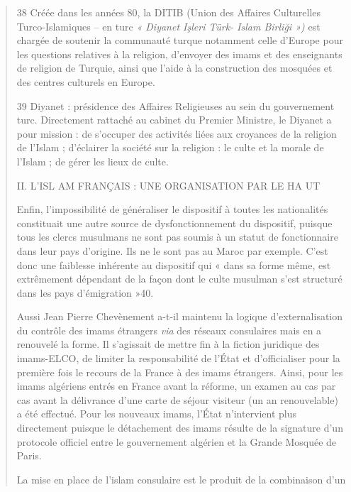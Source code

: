 \begin{quote}
38 Créée dans les années 80, la DITIB (Union des Affaires Culturelles
Turco-Islamiques -- en turc \emph{« Diyanet Işleri Türk- Islam Birliği
»)} est chargée de soutenir la communauté turque notamment celle
d'Europe pour les questions relatives à la religion, d'envoyer des imams
et des enseignants de religion de Turquie, ainsi que l'aide à la
construction des mosquées et des centres culturels en Europe.

39 Diyanet : présidence des Affaires Religieuses au sein du gouvernement
turc. Directement rattaché au cabinet du Premier Ministre, le Diyanet a
pour mission : de s'occuper des activités liées aux croyances de la
religion de l'Islam ; d'éclairer la société sur la religion : le culte
et la morale de l'Islam ; de gérer les lieux de culte.

II. L'ISL AM FRANÇAIS : UNE ORGANISATION PAR LE HA UT

Enfin, l'impossibilité de généraliser le dispositif à toutes les
nationalités constituait une autre source de dysfonctionnement du
dispositif, puisque tous les clercs musulmans ne sont pas soumis à un
statut de fonctionnaire dans leur pays d'origine. Ils ne le sont pas au
Maroc par exemple. C'est donc une faiblesse inhérente au dispositif qui
« dans sa forme même, est extrêmement dépendant de la façon dont le
culte musulman s'est structuré dans les pays d'émigration »40.

Aussi Jean Pierre Chevènement a-t-il maintenu la logique
d'externalisation du contrôle des imams étrangers \emph{via} des réseaux
consulaires mais en a renouvelé la forme. Il s'agissait de mettre fin à
la fiction juridique des imams-ELCO, de limiter la responsabilité de
l'État et d'officialiser pour la première fois le recours de la France à
des imams étrangers. Ainsi, pour les imams algériens entrés en France
avant la réforme, un examen au cas par cas avant la délivrance d'une
carte de séjour visiteur (un an renouvelable) a été effectué. Pour les
nouveaux imams, l'État n'intervient plus directement puisque le
détachement des imams résulte de la signature d'un protocole officiel
entre le gouvernement algérien et la Grande Mosquée de Paris.

La mise en place de l'islam consulaire est le produit de la combinaison
d'un


\end{quote}
